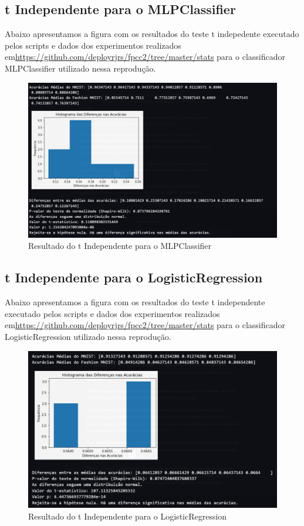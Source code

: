 \documentclass{article}
\begin{document}
\subsection{t Independente para o MLPClassifier}
Abaixo apresentamos a figura com os resultados do teste t indepedente executado pelos scripts e dados dos experimentos realizados em\url{https://github.com/deployrjrs/fpcc2/tree/master/stats} para o classificador MLPClassifier utilizado nessa reprodução.
\begin{figure}[H]
    \centering
    \includegraphics[width=1.0\textwidth]{MLPstats.png}
    \caption{Resultado do t Independente para o MLPClassifier}
    \label{fig:knstats}
\end{figure}

\subsection{t Independente para o LogisticRegression}
Abaixo apresentamos a figura com os resultados do teste t independente executado pelos scripts e dados dos experimentos realizados em\url{https://github.com/deployrjrs/fpcc2/tree/master/stats} para o classificador LogisticRegression utilizado nessa reprodução.
\begin{figure}[H]
    \centering
    \includegraphics[width=1.0\textwidth]{LRstats.png}
    \caption{Resultado do t Independente para o LogisticRegression}
    \label{fig:lrstats}
\end{figure}
\end{document}
